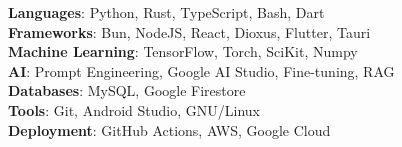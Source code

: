 \item{
    \textbf{Languages}{: Python, Rust, TypeScript, Bash, Dart} \\
    \textbf{Frameworks}{: Bun, NodeJS, React, Dioxus, Flutter, Tauri} \\
    \textbf{Machine Learning}{: TensorFlow, Torch, SciKit, Numpy} \\
    \textbf{AI}{: Prompt Engineering, Google AI Studio, Fine-tuning, RAG} \\
    \textbf{Databases}{: MySQL, Google Firestore} \\
    \textbf{Tools}{: Git, Android Studio, GNU/Linux} \\
    \textbf{Deployment}{: GitHub Actions, AWS, Google Cloud} \\
}
